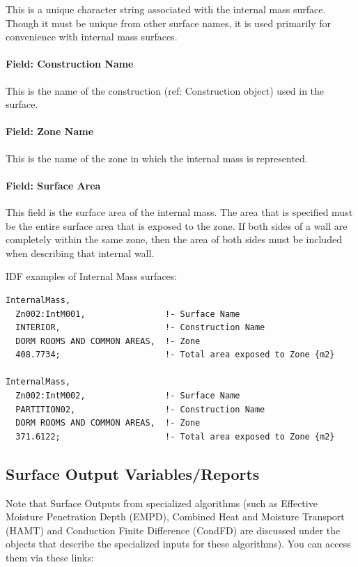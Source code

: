 This is a unique character string associated with the internal mass surface. Though it must be unique from other surface names, it is used primarily for convenience with internal mass surfaces.

\paragraph{Field: Construction Name}\label{field-construction-name-21}

This is the name of the construction (ref: Construction object) used in the surface.

\paragraph{Field: Zone Name}\label{field-zone-name-14}

This is the name of the zone in which the internal mass is represented.

\paragraph{Field: Surface Area}\label{field-surface-area}

This field is the surface area of the internal mass. The area that is specified must be the entire surface area that is exposed to the zone. If both sides of a wall are completely within the same zone, then the area of both sides must be included when describing that internal wall.

IDF examples of Internal Mass surfaces:

\begin{lstlisting}
InternalMass,
  Zn002:IntM001,                !- Surface Name
  INTERIOR,                     !- Construction Name
  DORM ROOMS AND COMMON AREAS,  !- Zone
  408.7734;                     !- Total area exposed to Zone {m2}

InternalMass,
  Zn002:IntM002,                !- Surface Name
  PARTITION02,                  !- Construction Name
  DORM ROOMS AND COMMON AREAS,  !- Zone
  371.6122;                     !- Total area exposed to Zone {m2}
\end{lstlisting}

\subsection{Surface Output Variables/Reports}\label{surface-output-variablesreports}

Note that Surface Outputs from specialized algorithms (such as Effective Moisture Penetration Depth (EMPD), Combined Heat and Moisture Transport (HAMT) and Conduction Finite Difference (CondFD) are discussed under the objects that describe the specialized inputs for these algorithms). You can access them via these links:

